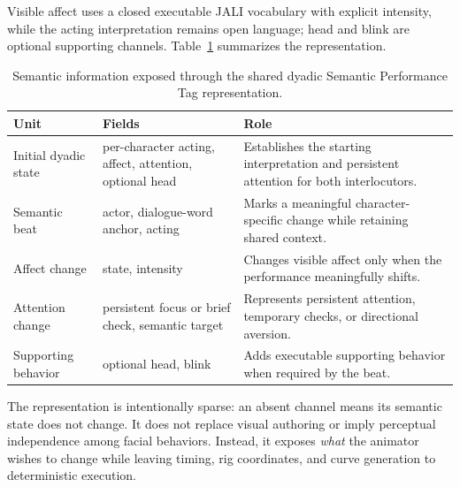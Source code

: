 Visible affect uses a closed executable JALI vocabulary with explicit intensity, while the acting interpretation remains open language; head and blink are optional supporting channels. Table~\ref{tab:semantic-performance-tags} summarizes the representation.

\begin{table}[t]
    \centering
    \caption{Semantic information exposed through the shared dyadic Semantic Performance Tag representation.}
    \label{tab:semantic-performance-tags}
    \begin{tabular}{p{} p{} p{}}
        \toprule
        \textbf{Unit} & \textbf{Fields} & \textbf{Role} \\
        \midrule
        Initial dyadic state &
        per-character acting, affect, attention, optional head &
        Establishes the starting interpretation and persistent attention for both interlocutors. \\

        Semantic beat &
        actor, dialogue-word anchor, acting &
        Marks a meaningful character-specific change while retaining shared context. \\

        Affect change &
        state, intensity &
        Changes visible affect only when the performance meaningfully shifts. \\

        Attention change &
        persistent focus or brief check, semantic target &
        Represents persistent attention, temporary checks, or directional aversion. \\

        Supporting behavior &
        optional head, blink &
        Adds executable supporting behavior when required by the beat. \\
        \bottomrule
    \end{tabular}
\end{table}

The representation is intentionally sparse: an absent channel means its semantic state does not change. It does not replace visual authoring or imply perceptual independence among facial behaviors. Instead, it exposes \textit{what} the animator wishes to change while leaving timing, rig coordinates, and curve generation to deterministic execution.
